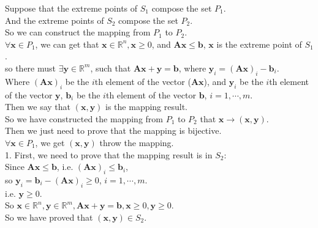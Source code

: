 \documentclass[10pt]{article}
\renewcommand{\mathbf}{\boldsymbol}
\begin{document}
Suppose that the extreme points of $S_1$ compose the set $P_1$.\\
And the extreme points of $S_2$ compose the set $P_2$.\\
So we can construct the mapping from $P_1$ to $P_2$.\\
$\forall\mathbf{x}\in P_1$, we can get that $\mathbf{x}\in\mathbb{R}^n,\mathbf{x}\geq 0$, and $\mathbf{Ax}\leq\mathbf{b}$, $\mathbf{x}$ is the extreme point of $S_1$.\\
so there must $\exists \mathbf{y}\in \mathbb{R}^m$, such that $\mathbf{Ax}+\mathbf{y}=\mathbf{b}$, where $\mathbf{y}_i=(\mathbf{Ax})_i-\mathbf{b}_i$.\\
Where $(\mathbf{Ax})_i$ be the $i$th element of the vector ($\mathbf{Ax}$), and $\mathbf{y}_i$ be the $i$th element of the vector $\mathbf{y}$, $\mathbf{b}_i$ be the $i$th element of the vector $\mathbf{b}$, $i=1,\cdots,m$.\\
Then we say that $(\mathbf{x},\mathbf{y})$ is the mapping result.\\
So we have constructed the mapping from $P_1$ to $P_2$ that $\mathbf{x}\to(\mathbf{x},\mathbf{y})$.\\

Then we just need to prove that the mapping is bijective.\\
$\forall\mathbf{x}\in P_1$, we get $(\mathbf{x},\mathbf{y})$ throw the mapping.\\
1. First, we need to prove that the mapping result is in $S_2$:\\
Since $\mathbf{Ax}\leq \mathbf{b}$, i.e. $(\mathbf{Ax})_i\leq\mathbf{b}_i$,\\
so $\mathbf{y}_i=\mathbf{b}_i-(\mathbf{Ax})_i\geq 0$, $i=1,\cdots,m$.\\
i.e. $\mathbf{y}\geq 0$.\\
So $\mathbf{x}\in\mathbb{R}^n,\mathbf{y}\in\mathbb{R}^m,\mathbf{Ax}+\mathbf{y}=\mathbf{b},\mathbf{x}\geq 0,\mathbf{y}\geq 0$.\\
So we have proved that $(\mathbf{x},\mathbf{y})\in S_2$.\\
\end{document}
